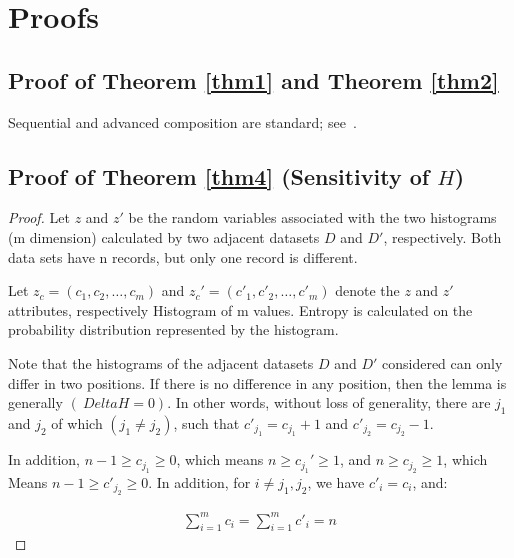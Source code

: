 \appendix

\section{Proofs}\label{app:proofs}

\subsection{Proof of Theorem \ref{thm1} and Theorem \ref{thm2}}
Sequential and advanced composition are standard; see~\cite{dwork2014algorithmic}.

\subsection{Proof of Theorem \ref{thm4} (Sensitivity of $H$)}
\begin{proof}
Let $ z $ and $ z '$ be the random variables associated with the two histograms (m dimension) calculated by two adjacent datasets $ D $ and $ D' $, respectively. Both data sets have n records, but only one record is different.

Let $ z_c = (c_1, c_2, \dots, c_m) $ and $ z_c '= (c'_1, c'_2, \dots, c'_m) $ denote the $ z $ and $ z' $ attributes, respectively Histogram of m values. Entropy is calculated on the probability distribution represented by the histogram.

Note that the histograms of the adjacent datasets $ D $ and $ D '$ considered can only differ in two positions. If there is no difference in any position, then the lemma is generally $ (\ Delta H = 0) $. In other words, without loss of generality, there are $ j_1 $ and $ j_2 $ of which $ (j_1 \neq j_2) $, such that $ c '_{j_1} = c_{j_1} + 1 $ and $ c' _{j_2 } = c_{j_2} -1 $.

In addition, $ n-1 \geq c_{j_1} \geq 0 $, which means $ n \geq c_{j_1} ' \geq 1 $, and $ n \geq c_ {j_2} \geq 1 $, which Means $ n-1 \geq c'_{j_2} \geq 0 $. In addition, for $ i \neq j_1, j_2 $, we have $ c'_i = c_i $, and:

\begin{eqnarray}
\sum^m_{i=1} c_i = \sum^m_{i=1} c'_i =n
\end{eqnarray}


\end{proof}
